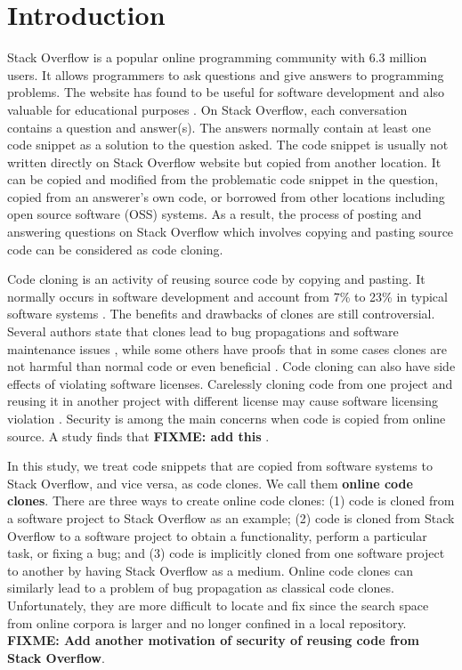 \documentclass{sig-alternate-05-2015}
\newcommand\FIXME[1]{\textbf{FIXME: #1}}
\begin{document}
\section{Introduction}
Stack Overflow is a popular online programming community with 6.3 million users. It allows programmers to ask questions and give answers to programming problems. The website has found to be useful for software development and also valuable for educational purposes \cite{x}. On Stack Overflow, each conversation contains a question and answer(s).  The answers normally contain at least one code snippet as a solution to the question asked. The code snippet is usually not written directly on Stack Overflow website but copied from another location. It can be copied and modified from the problematic code snippet in the question, copied from an answerer's own code, or borrowed from other locations including open source software (OSS) systems. As a result, the process of posting and answering questions on Stack Overflow which involves copying and pasting source code can be considered as code cloning. 

Code cloning is an activity of reusing source code by copying and pasting. It normally occurs in software development and account from 7\% to 23\% in typical software systems \cite{Bellon2007}. The benefits and drawbacks of clones are still controversial. Several authors state that clones lead to bug propagations and software maintenance issues \cite{Kamiya2002}, while some others have proofs that in some cases clones are not harmful than normal code or even beneficial \cite{Saini2016,Kapser2006}. Code cloning can also have side effects of violating software licenses. Carelessly cloning code from one project and reusing it in another project with different license may cause software licensing violation \cite{German2009}. Security is among the main concerns when code is copied from online source. A study finds that \FIXME{add this} \cite{Acar2016}.

In this study, we treat code snippets that are copied from software systems to Stack Overflow, and vice versa, as code clones. We call them \textbf{online code clones}. There are three ways to create online code clones: (1) code is cloned from a software project to Stack Overflow as an example; (2) code is cloned from Stack Overflow to a software project to obtain a functionality, perform a particular task, or fixing a bug; and (3) code is implicitly cloned from one software project to another by having Stack Overflow as a medium. Online code clones can similarly lead to a problem of bug propagation as classical code clones. Unfortunately, they are more difficult to locate and fix since the search space from online corpora is larger and no longer confined in a local repository. \FIXME{Add another motivation of security of reusing code from Stack Overflow}.
\end{document}
